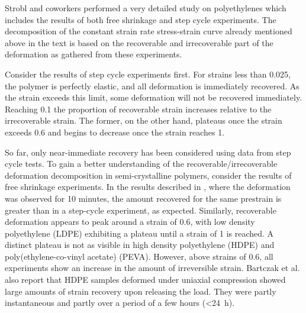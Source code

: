 Strobl and coworkers \citep{hissNetworkStretchingSlip1999, hobeikaTemperatureStrainRate2000, hongModelTreatingTensile2004, hongModelTreatmentTensile2004, naViscousForceDominatedTensileDeformation2006} performed a very detailed study on polyethylenes which includes the results of both free shrinkage and step cycle experiments.
The decomposition of the constant strain rate stress-strain curve already mentioned above in the text is based on the recoverable and irrecoverable part of the deformation as gathered from these experiments.

Consider the results of step cycle experiments first.
For strains less than 0.025, the polymer is perfectly elastic, and all deformation is immediately recovered.
As the strain exceeds this limit, some deformation will not be recovered immediately.
Reaching 0.1 the proportion of recoverable strain increases relative to the irrecoverable strain.
The former, on the other hand, plateaus once the strain exceeds 0.6 and begins to decrease once the strain reaches 1.

So far, only near-immediate recovery has been considered using data from step cycle tests.
To gain a better understanding of the recoverable/irrecoverable deformation decomposition in semi-crystalline polymers, consider the results of free shrinkage experiments.
In the results described in \cite{hissNetworkStretchingSlip1999}, where the deformation was observed for 10 minutes, the amount recovered for the same prestrain is greater than in a step-cycle experiment, as expected.
Similarly, recoverable deformation appears to peak around a strain of 0.6, with low density polyethylene (LDPE) exhibiting a plateau until a strain of 1 is reached.
A distinct plateau is not as visible in high density polyethylene (HDPE) and poly(ethylene-co-vinyl acetate) (PEVA).
However, above strains of 0.6, all experiments show an increase in the amount of irreversible strain.
Bartczak et al. \citep{bartczakEvolutionCrystallineTexture1992} also report that HDPE samples deformed under uniaxial compression showed large amounts of strain recovery upon releasing the load.
They were partly instantaneous and partly over a period of a few hours (<\SI{24}{\hour}).

